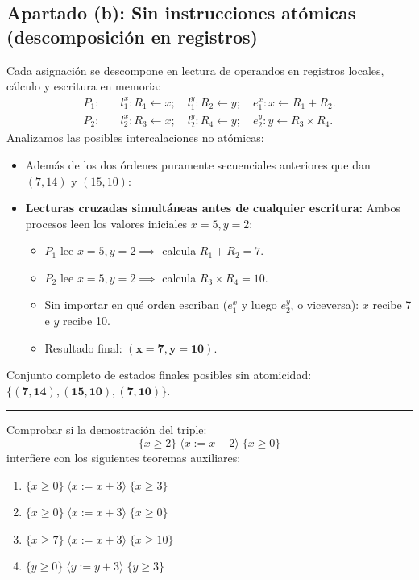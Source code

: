 \documentclass[11pt,a4paper,twoside,openright]{report}
\begin{document}
\begin{solucion}
\subsection*{Apartado (b): Sin instrucciones atómicas (descomposición en registros)}
Cada asignación se descompone en lectura de operandos en registros locales, cálculo y escritura en memoria:
\begin{align*}
P_1: \quad & l_1^x: R_1 \leftarrow x; \quad l_1^y: R_2 \leftarrow y; \quad e_1^x: x \leftarrow R_1 + R_2. \\
P_2: \quad & l_2^x: R_3 \leftarrow x; \quad l_2^y: R_4 \leftarrow y; \quad e_2^y: y \leftarrow R_3 \times R_4.
\end{align*}
Analizamos las posibles intercalaciones no atómicas:
\begin{itemize}[leftmargin=*]
    \item Además de los dos órdenes puramente secuenciales anteriores que dan $(7, 14)$ y $(15, 10)$:
    \item \textbf{Lecturas cruzadas simultáneas antes de cualquier escritura:}
    Ambos procesos leen los valores iniciales $x = 5, y = 2$:
    \begin{itemize}
        \item $P_1$ lee $x=5, y=2 \implies$ calcula $R_1 + R_2 = 7$.
        \item $P_2$ lee $x=5, y=2 \implies$ calcula $R_3 \times R_4 = 10$.
        \item Sin importar en qué orden escriban ($e_1^x$ y luego $e_2^y$, o viceversa):
        $x$ recibe 7 e $y$ recibe 10.
        \item Resultado final: $\mathbf{(x = 7, y = 10)}$.
    \end{itemize}
\end{itemize}
Conjunto completo de estados finales posibles sin atomicidad: $\mathbf{\{(7, 14), (15, 10), (7, 10)\}}$.
\end{solucion}

\vspace{15pt}
\hrule
\vspace{15pt}

\begin{ejercicio}
Comprobar si la demostración del triple:
\[
\{x \ge 2\} \; \langle x := x - 2 \rangle \; \{x \ge 0\}
\]
interfiere con los siguientes teoremas auxiliares:
\begin{enumerate}[label=(\alph*),leftmargin=*]
    \item $\{x \ge 0\} \; \langle x := x + 3 \rangle \; \{x \ge 3\}$
    \item $\{x \ge 0\} \; \langle x := x + 3 \rangle \; \{x \ge 0\}$
    \item $\{x \ge 7\} \; \langle x := x + 3 \rangle \; \{x \ge 10\}$
    \item $\{y \ge 0\} \; \langle y := y + 3 \rangle \; \{y \ge 3\}$
\end{enumerate}
\end{ejercicio}
\end{document}
